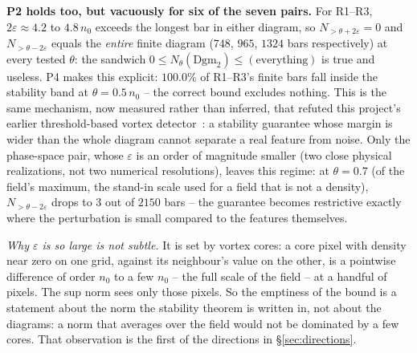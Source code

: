 \documentclass[11pt,a4paper]{article}
\begin{document}
\begin{failbox}
\textbf{P2 holds too, but vacuously for six of the seven pairs.} For R1--R3, $2\varepsilon\approx4.2$ to
$4.8\,n_0$ exceeds the longest bar in either diagram, so $N_{>\theta+2\varepsilon}=0$ and
$N_{>\theta-2\varepsilon}$ equals the \emph{entire} finite diagram ($748$, $965$, $1324$ bars
respectively) at every tested $\theta$: the sandwich $0\le N_\theta(\mathrm{Dgm}_2)\le(\text{everything})$
is true and useless. P4 makes this explicit: $100.0\%$ of R1--R3's finite bars fall inside the stability
band at $\theta=0.5\,n_0$ -- the correct bound excludes nothing. This is the same mechanism, now
measured rather than inferred, that refuted this project's earlier threshold-based vortex
detector~\cite{Callens2026TDA}: a stability guarantee whose margin is wider than the whole diagram
cannot separate a real feature from noise. Only the phase-space pair, whose $\varepsilon$ is an order of
magnitude smaller (two close physical realizations, not two numerical resolutions), leaves this regime:
at $\theta=0.7$ (of the field's maximum, the stand-in scale used for a field that is not a density),
$N_{>\theta-2\varepsilon}$ drops to $3$ out of $2150$ bars -- the guarantee becomes restrictive exactly
where the perturbation is small compared to the features themselves.

\emph{Why $\varepsilon$ is so large is not subtle.} It is set by vortex cores: a core pixel with density
near zero on one grid, against its neighbour's value on the other, is a pointwise difference of order
$n_0$ to a few $n_0$ -- the full scale of the field -- at a handful of pixels. The sup norm sees only
those pixels. So the emptiness of the bound is a statement about the norm the stability theorem is
written in, not about the diagrams: a norm that averages over the field would not be dominated by a few
cores. That observation is the first of the directions in \S\ref{sec:directions}.
\end{failbox}
\end{document}
